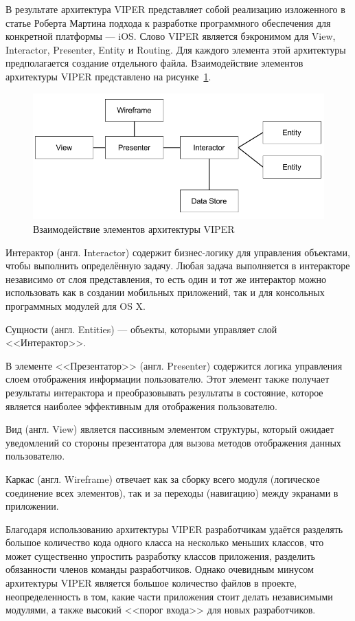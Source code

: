 В результате архитектура VIPER представляет собой реализацию
изложенного в статье Роберта Мартина подхода к разработке программного обеспечения
для конкретной платформы --- iOS. Слово VIPER является бэкронимом для View,
Interactor, Presenter, Entity и Routing. Для каждого элемента этой архитектуры
предполагается создание отдельного файла. Взаимодействие элементов архитектуры
VIPER представлено на рисунке~\ref{fig:viper}.
\begin{figure}[h!]
  \centering
  \includegraphics[width=150mm]{fig/viper}
  \caption{Взаимодействие элементов архитектуры VIPER}
  \label{fig:viper}
\end{figure}

Интерактор (англ. Interactor) содержит бизнес-логику для управления объектами,
чтобы выполнить определённую задачу. Любая задача выполняется в интеракторе независимо
от слоя представления, то есть один и тот же интерактор можно использовать как в
создании мобильных приложений, так и для консольных программных модулей для OS X.

Сущности (англ. Entities) --- объекты, которыми управляет слой <<Интерактор>>.

В элементе <<Презентатор>> (англ. Presenter) содержится логика управления слоем
отображения информации пользователю. Этот элемент также получает результаты
интерактора и преобразовывать результаты в состояние, которое является наиболее
эффективным для отображения пользователю.

Вид (англ. View) является пассивным элементом структуры, который ожидает уведомлений
со стороны презентатора для вызова методов отображения данных пользователю.

Каркас (англ. Wireframe) отвечает как за сборку всего модуля (логическое
соединение всех элементов), так и за переходы (навигацию) между экранами
в приложении.

Благодаря использованию архитектуры VIPER разработчикам удаётся
разделять большое количество кода одного класса на несколько меньших классов,
что может существенно упростить разработку классов приложения,
разделить обязанности членов команды разработчиков.
Однако очевидным минусом архитектуры VIPER является большое количество
файлов в проекте, неопределенность в том, какие части приложения стоит делать
независимыми модулями, а также высокий <<порог входа>> для новых разработчиков.

